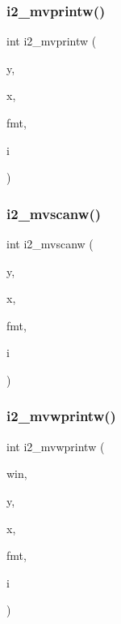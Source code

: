 \subsubsection{\texorpdfstring{i2\+\_\+mvprintw()}{i2\_mvprintw()}}
{\footnotesize\ttfamily int i2\+\_\+mvprintw (\begin{DoxyParamCaption}\item[{int}]{y,  }\item[{int}]{x,  }\item[{const char $\ast$}]{fmt,  }\item[{short}]{i }\end{DoxyParamCaption})}

\mbox{\label{C-macros_8c_ac3ddc9a07837b44a0d66ef085f764609}} 
\subsubsection{\texorpdfstring{i2\+\_\+mvscanw()}{i2\_mvscanw()}}
{\footnotesize\ttfamily int i2\+\_\+mvscanw (\begin{DoxyParamCaption}\item[{int}]{y,  }\item[{int}]{x,  }\item[{char $\ast$}]{fmt,  }\item[{short $\ast$}]{i }\end{DoxyParamCaption})}

\mbox{\label{C-macros_8c_a880d70f3a8db453d86b23072715762cc}} 
\subsubsection{\texorpdfstring{i2\+\_\+mvwprintw()}{i2\_mvwprintw()}}
{\footnotesize\ttfamily int i2\+\_\+mvwprintw (\begin{DoxyParamCaption}\item[{W\+I\+N\+D\+OW $\ast$}]{win,  }\item[{int}]{y,  }\item[{int}]{x,  }\item[{const char $\ast$}]{fmt,  }\item[{short}]{i }\end{DoxyParamCaption})}

